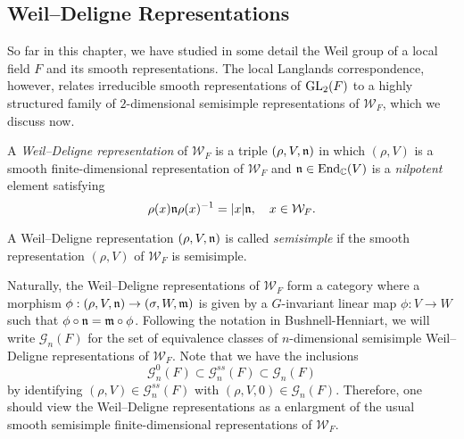 \subsection{Weil--Deligne Representations}
So far in this chapter, we have studied in some detail the Weil group of a local field $F$ and its smooth representations. The local Langlands correspondence, however, relates irreducible smooth representations of $\mathrm{GL}_2(F)$ to a highly structured family of $2$-dimensional semisimple representations of $\mathcal{W}_F$, which we discuss now.

\begin{defn}\label{defn:WeilDeligne}
    A \textit{Weil--Deligne representation} of $\mathcal{W}_F$ is a triple $(\rho,V,\mathfrak{n})$ in which $(\rho,V)$ is a smooth finite-dimensional representation of $\mathcal{W}_F$ and $\mathfrak{n}\in\mathrm{End}_{\mathbb{C}}(V)$ is a \textit{nilpotent} element satisfying
    $$\rho(x)\mathfrak{n}\rho(x)^{-1}=|x|\mathfrak{n},\quad x\in \mathcal{W}_F.$$

    A Weil--Deligne representation $(\rho,V,\mathfrak{n})$ is called \textit{semisimple} if the smooth representation $(\rho,V)$ of $\mathcal{W}_F$ is semisimple.
\end{defn}

Naturally, the Weil--Deligne representations of $\mathcal{W}_F$ form a category where a morphism $\phi:(\rho,V,\mathfrak{n})\to(\sigma,W,\mathfrak{m})$ is given by a $G$-invariant linear map $\phi:V\to W$ such that $\phi\circ\mathfrak{n}=\mathfrak{m}\circ\phi$. Following the notation in Bushnell-Henniart, we will write $\mathcal{G}_n(F)$ for the set of equivalence classes of $n$-dimensional semisimple Weil--Deligne representations of $\mathcal{W}_F$. Note that we have the inclusions
$$\mathcal{G}^{0}_n(F)\subset\mathcal{G}_n^{ss}(F)\subset\mathcal{G}_n(F)$$
by identifying $(\rho,V)\in\mathcal{G}_n^{ss}(F)$ with $(\rho,V,0)\in\mathcal{G}_n(F)$. Therefore, one should view the Weil--Deligne representations as a enlargment of the usual smooth semisimple finite-dimensional representations of $\mathcal{W}_F$. 

